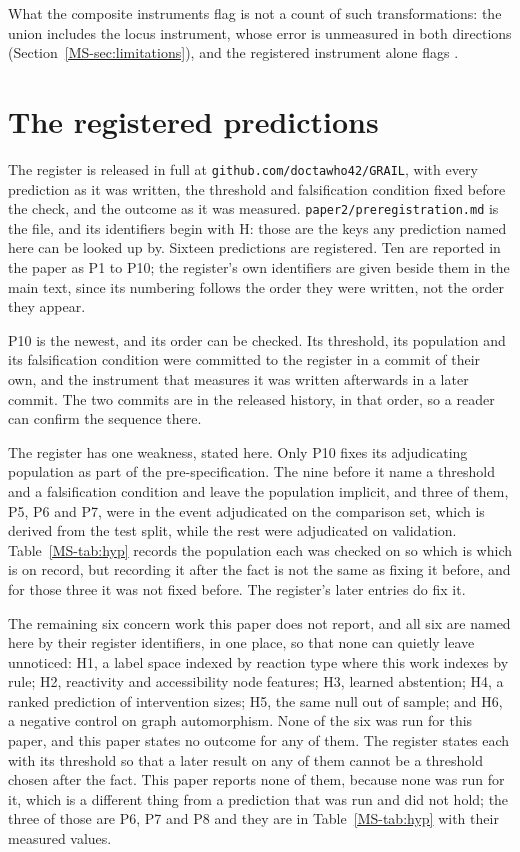 \documentclass[journal=jcisd8,manuscript=suppinfo,layout=onecolumn]{achemso}
\begin{document}
What the composite instruments flag is not a count of such transformations: the union includes the
locus instrument, whose error is unmeasured
in both directions (Section~\ref{MS-sec:limitations}), and the registered instrument alone flags
\numRefstepEdits{}.
\section{The registered predictions}
\label{sec:si-register}

The register is released in full at \texttt{github.com/doctawho42/GRAIL}, with every prediction as
it was written, the threshold and falsification condition fixed before the check, and the outcome
as it was measured. \texttt{paper2/preregistration.md} is the file, and its identifiers begin with H:
those are the keys any prediction named here can be looked up by. Sixteen predictions are registered. Ten are reported in the paper as P1 to
P10; the register's own identifiers are given beside them in the main text, since its numbering
follows the order they were written, not the order they appear.

P10 is the newest, and its order can be checked. Its threshold, its population
and its falsification condition were committed to the register in a commit of their own, and the
instrument that measures it was written afterwards in a later commit. The two commits are in the
released history, in that order, so a reader can confirm the sequence there.

The register has one weakness, stated here. Only P10 fixes its
adjudicating population as part of the pre-specification. The nine before it name a threshold and
a falsification condition and leave the population implicit, and three of them, P5, P6 and P7,
were in the event adjudicated on the comparison set, which is derived from the test split,
while the rest were adjudicated on validation. Table~\ref{MS-tab:hyp} records the population each
was checked on
so which is which is on record, but recording it after the fact is not the same as fixing
it before, and for those three it was not fixed before. The register's later entries do fix it.

The remaining six concern work this paper does not report, and all six are named here by their
register identifiers, in one place, so that none can quietly leave unnoticed: H1, a label space
indexed by reaction type where this work indexes by rule; H2, reactivity and accessibility node
features; H3, learned abstention; H4, a ranked prediction of intervention sizes; H5, the same null
out of sample; and H6, a negative control on graph automorphism. None of the six was run for this paper, and this paper states no outcome for any of them. The register states each with its threshold so that a later
result on any of them cannot be a threshold chosen after the fact. This paper reports none of them,
because none was run for it, which is a different thing from a prediction that was run and did
not hold; the three of those are P6, P7 and P8 and they are in Table~\ref{MS-tab:hyp} with their
measured
values.
\end{document}
